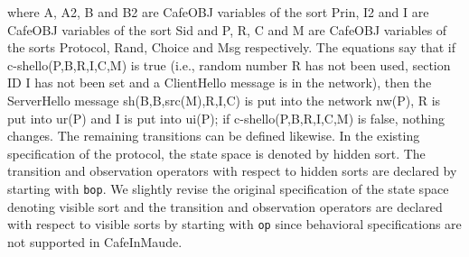 \documentclass[a4paper,fleqn]{cas-dc}
\begin{document}
where A, A2, B and B2 are CafeOBJ variables of the sort Prin, I2 and I are CafeOBJ variables of the sort Sid and P, R, C and M are CafeOBJ variables of the sorts Protocol, Rand, Choice and Msg respectively.
The  equations  say  that  if c-shello(P,B,R,I,C,M) is  true
(i.e., random number R has not been used, section ID I has not been set and a ClientHello message is in the network), then the ServerHello message sh(B,B,src(M),R,I,C) is put into the network nw(P), R is put into ur(P) and I is put into ui(P); if c-shello(P,B,R,I,C,M) is  false,  nothing  changes.  The remaining transitions can be defined likewise.
In the existing specification of the protocol, the state space is denoted by hidden sort. The transition and observation operators with respect to hidden sorts are declared by starting with \verb !bop!. We slightly revise the original specification of the state space denoting visible sort and the transition and observation operators are declared with respect to visible sorts by starting with \verb !op! since behavioral specifications are not supported in CafeInMaude.
\end{document}
